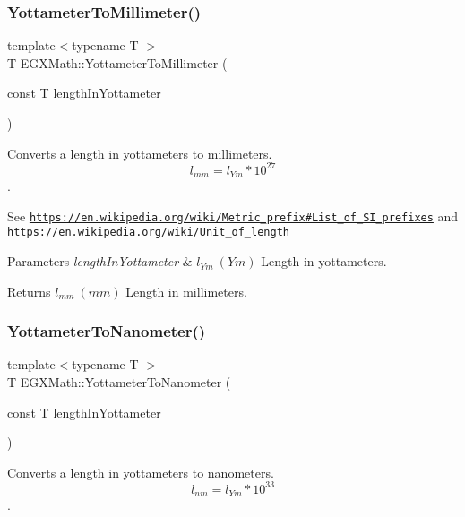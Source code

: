 \subsubsection{\texorpdfstring{Yottameter\+To\+Millimeter()}{YottameterToMillimeter()}}
{\footnotesize\ttfamily template$<$typename T $>$ \\
T E\+G\+X\+Math\+::\+Yottameter\+To\+Millimeter (\begin{DoxyParamCaption}\item[{const T}]{length\+In\+Yottameter }\end{DoxyParamCaption})}



Converts a length in yottameters to millimeters. \[ l_{mm}=l_{Ym} * 10^{27} \]. 

See \href{https://en.wikipedia.org/wiki/Metric_prefix#List_of_SI_prefixes}{\tt https\+://en.\+wikipedia.\+org/wiki/\+Metric\+\_\+prefix\#\+List\+\_\+of\+\_\+\+S\+I\+\_\+prefixes} and \href{https://en.wikipedia.org/wiki/Unit_of_length}{\tt https\+://en.\+wikipedia.\+org/wiki/\+Unit\+\_\+of\+\_\+length} 
\begin{DoxyParams}{Parameters}
{\em length\+In\+Yottameter} & $ l_{Ym}\ (Ym)$ Length in yottameters. \\
\hline
\end{DoxyParams}
\begin{DoxyReturn}{Returns}
$ l_{mm}\ (mm)$ Length in millimeters. 
\end{DoxyReturn}
\mbox{\label{group___e_g_x_math-_conversions-_length_conversions-_yottameter-_s_i_ga9e117a640ecd0bea911edac05c685c31}} 
\subsubsection{\texorpdfstring{Yottameter\+To\+Nanometer()}{YottameterToNanometer()}}
{\footnotesize\ttfamily template$<$typename T $>$ \\
T E\+G\+X\+Math\+::\+Yottameter\+To\+Nanometer (\begin{DoxyParamCaption}\item[{const T}]{length\+In\+Yottameter }\end{DoxyParamCaption})}



Converts a length in yottameters to nanometers. \[ l_{nm}=l_{Ym} * 10^{33} \]. 

